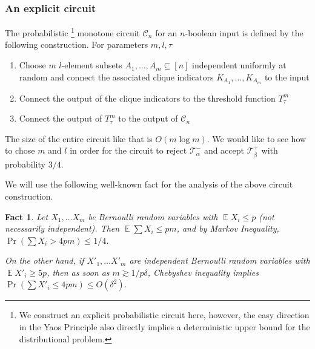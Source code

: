 \documentclass[10pt,a4paper]{article}
\DeclareMathOperator{\E}{\mathbb{E}}
\newtheorem{fact}[theorem]{Fact}
\newcommand{\jnote}[1]{\todo[inline,backgroundcolor=blue!20!green]{#1 \\ \textsc{--Jarek}}}
\newcommand{\lnote}[1]{\todo[inline,backgroundcolor=blue!20!yellow]{#1 \\ \textsc{--Linus}}}
\begin{document}
\subsubsection*{An explicit circuit}
The probabilistic \footnote{ We construct an explicit probabilistic circuit here, however, the easy direction in the Yaos Principle \cite{yao1977probabilistic} also directly implies a deterministic upper bound for the distributional problem.} monotone circuit $\mathcal{C}_n$ for an $n$-boolean input is defined by the following construction. For parameters $m, l, \tau$
\begin{enumerate}
    \item Choose $m$ $l$-element subsets $A_1, \dots, A_m \subseteq [n]$ independent uniformly at random and connect the associated clique indicators $K_{A_1}, \dots, K_{A_m}$ to the input 
    \item Connect the output of the clique indicators to the threshold function $T_\tau^m$
    \item Connect the output of $T_\tau^m$ to the output of $\mathcal{C}_n$
\end{enumerate}

The size of the entire circuit like that is $O(m\log m)$. We would like to see how to chose $m$ and $l$ in order for the circuit to reject $\mathcal{T}^-_{\alpha}$ and accept $\mathcal{T}^+_{\beta}$ with probability $3/4$.

We will use the following well-known fact for the analysis of the above circuit construction.



\begin{fact}
\label{fact:distinguish}
Let $X_1, \ldots X_m$ be Bernoulli random variables with $\E X_i \leq p$ (not necessarily independent). Then $\E \sum X_i \leq pm$, and by Markov Inequality, $\Pr(\sum X_i > 4 pm) \leq 1/4$.

On the other hand, if $X'_1, \ldots X'_m$ are independent  Bernoulli random variables with $\E X'_i \geq 5p$, then  as soon as $m \gtrsim 1/p\delta$, Chebyshev inequality implies $\Pr(\sum X'_i \leq 4 pm) \leq O(\delta^2).$
\end{fact}
\end{document}
